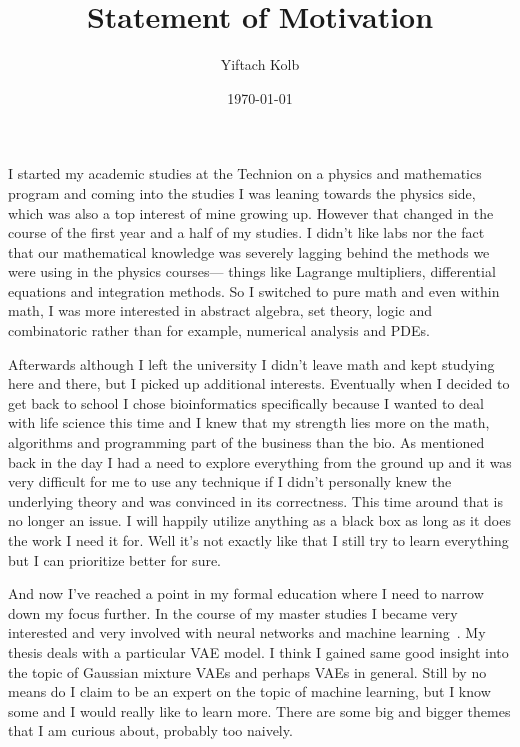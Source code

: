 \documentclass[a4paper,10pt]{article}
\begin{document}

\title{Statement of Motivation}
\author{Yiftach Kolb}
\date{\today}

\maketitle

I started my academic studies at the Technion on a physics and mathematics
program and coming into the studies I was leaning towards the
physics side, which was also a top interest of mine growing up.
However that changed in the course of the first year and a half of my studies.
I didn't like labs nor the fact that our mathematical knowledge was severely
lagging behind the methods we were using in the physics courses---
things like Lagrange
multipliers, differential equations and integration methods.
So I switched to pure math and even within math, I was more interested in
abstract algebra, set theory, logic and combinatoric rather than for example,
numerical analysis and PDEs.

Afterwards although I left the university I didn't leave math and kept studying
here and there, but I picked up additional interests. Eventually when I decided
to get back to school I chose bioinformatics specifically because I
wanted to deal with life science this time and I knew that my strength lies more
on the math, algorithms and programming part of the business than the bio.
As mentioned back in the day I had a
need to explore everything from the ground up and it was very difficult for me
to use any technique if I didn't personally knew the underlying theory and
was convinced in its correctness.
This time around that is no longer an issue. I will
happily utilize anything as a black box as long as it does the work I need it
for. Well it's not exactly like that I still try to learn everything but I can
prioritize better for sure.

And now I've reached a point in my formal education where I need to narrow down
my focus further.
In the course of my master studies I became very interested and very involved
with neural networks and machine learning~\cite{mpgvaeRepo}. My thesis deals with a particular VAE
model. I think I gained same good insight into the topic of Gaussian mixture
VAEs and perhaps VAEs in general.
Still by no means do I claim to be an expert on the topic of machine learning,
but I know some and I would really like to learn more.
There are some big and bigger themes that I am curious about, probably too
naively.
\end{document}
